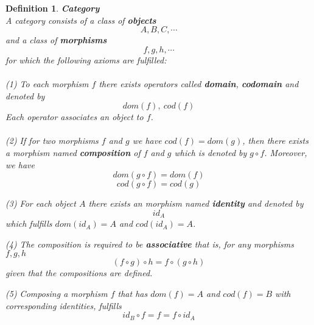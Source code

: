 \documentclass[17pt]{extarticle}
\newtheorem{definition}{Definition}
\begin{document}
	\begin{definition}
		\textbf{Category}\\
A category consists of a class of \textbf{objects} 
$$
A, B, C, \cdots
$$
 and a class of \textbf{morphisms}
 $$f, g, h, \cdots$$
for which the following axioms are fulfilled:\\ \\
(1) To each morphism $f$ there exists operators called \textbf{domain}, \textbf{codomain}
and denoted by
$$ dom(f), \ cod(f)$$
Each operator associates an object to $f$.\\ \\

(2) If for two morphisms $f$ and $g$ we have $cod(f)=dom(g)$, then there exists a morphism
named \textbf{composition} of $f$ and $g$ which is denoted by $g\circ f$.
Moreover, we have 
$$dom(g\circ f)=dom(f)$$
$$ cod(g\circ f)=cod(g)$$

(3) For each object $A$ there exists an morphism named \textbf{identity} and denoted by
$$id_A$$ which fulfills $dom(id_A)=A$ and $cod(id_A)=A$.

(4) The composition is required to be \textbf{associative} that is, for any morphisms $f,g,h$ 
$$(f\circ g)\circ h=f\circ(g\circ h)$$
given that the compositions are defined.

(5) Composing a morphism $f$ that has $dom(f)=A$ and $cod(f)=B$ with corresponding identities, fulfills
$$id_B\circ f=f=f\circ id_A$$
\end{definition}
\end{document}
